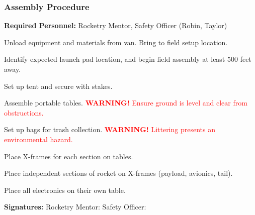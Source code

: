 	\subsubsection*{Assembly Procedure}
	\textbf{Required Personnel:} Rocketry Mentor, Safety Officer (Robin, Taylor)
	\begin{todolist}		
		\item Unload equipment and materials from van. Bring to field setup location.
		\item Identify expected launch pad location, and begin field assembly at least 500 feet away.
		\item Set up tent and secure with stakes.
		\item Assemble portable tables. \textcolor{red}{\textbf{WARNING!} Ensure ground is level and clear from obstructions.}
		\item Set up bags for trash collection. \textcolor{red}{\textbf{WARNING!} Littering presents an environmental hazard.}
		\item Place X-frames for each section on tables.
		\item Place independent sections of rocket on X-frames (payload, avionics, tail).
		\item Place all electronics on their own table.
	\end{todolist}
	\bigbreak
	\bigbreak
	\textbf{Signatures:}
	\bigbreak
	Rocketry Mentor: \underline{\hspace{6cm}}
	\bigbreak
	\bigbreak
	Safety Officer: \underline{\hspace{6cm}}
	